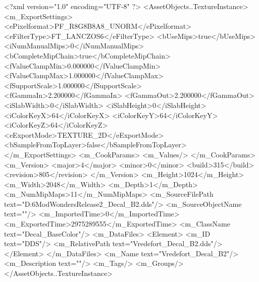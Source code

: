 <?xml version="1.0" encoding="UTF-8" ?>
<AssetObjects..TextureInstance>
	<m_ExportSettings>
		<ePixelformat>PF_R8G8B8A8_UNORM</ePixelformat>
		<eFilterType>FT_LANCZOS6</eFilterType>
		<bUseMips>true</bUseMips>
		<iNumManualMips>0</iNumManualMips>
		<bCompleteMipChain>true</bCompleteMipChain>
		<fValueClampMin>0.000000</fValueClampMin>
		<fValueClampMax>1.000000</fValueClampMax>
		<fSupportScale>1.000000</fSupportScale>
		<fGammaIn>2.200000</fGammaIn>
		<fGammaOut>2.200000</fGammaOut>
		<iSlabWidth>0</iSlabWidth>
		<iSlabHeight>0</iSlabHeight>
		<iColorKeyX>64</iColorKeyX>
		<iColorKeyY>64</iColorKeyY>
		<iColorKeyZ>64</iColorKeyZ>
		<eExportMode>TEXTURE_2D</eExportMode>
		<bSampleFromTopLayer>false</bSampleFromTopLayer>
	</m_ExportSettings>
	<m_CookParams>
		<m_Values/>
	</m_CookParams>
	<m_Version>
		<major>4</major>
		<minor>0</minor>
		<build>315</build>
		<revision>805</revision>
	</m_Version>
	<m_Height>1024</m_Height>
	<m_Width>2048</m_Width>
	<m_Depth>1</m_Depth>
	<m_NumMipMaps>11</m_NumMipMaps>
	<m_SourceFilePath text="D:\Civ6Mod\Terrain\NW\Natural Wonders\TM Release2\Vredefort\Vredefort_Decal_B2.dds"/>
	<m_SourceObjectName text=""/>
	<m_ImportedTime>0</m_ImportedTime>
	<m_ExportedTime>2975289555</m_ExportedTime>
	<m_ClassName text="Decal_BaseColor"/>
	<m_DataFiles>
		<Element>
			<m_ID text="DDS"/>
			<m_RelativePath text="Vredefort_Decal_B2.dds"/>
		</Element>
	</m_DataFiles>
	<m_Name text="Vredefort_Decal_B2"/>
	<m_Description text=""/>
	<m_Tags/>
	<m_Groups/>
</AssetObjects..TextureInstance>

